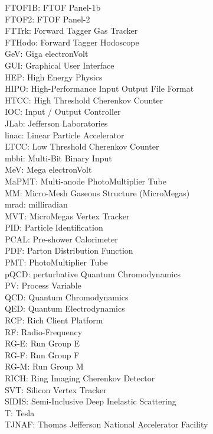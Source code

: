 {    FTOF1B:    FTOF Panel-1b \\
    FTOF2:     FTOF Panel-2 \\
    FTTrk:     Forward Tagger Gas Tracker \\
    FTHodo:    Forward Tagger Hodoscope \\
    GeV:       Giga electronVolt \\
    GUI:       Graphical User Interface \\
    HEP:       High Energy Physics \\
    HIPO:      High-Performance Input Output File Format \\
    HTCC:      High Threshold Cherenkov Counter \\
    IOC:       Input / Output Controller \\
    JLab:      Jefferson Laboratories \\
    linac:     Linear Particle Accelerator \\
    LTCC:      Low Threshold Cherenkov Counter \\
    mbbi:      Multi-Bit Binary Input \\
    MeV:       Mega electronVolt \\
    MaPMT:     Multi-anode PhotoMultiplier Tube \\
    MM:        Micro-Mesh Gaseous Structure (MicroMegas) \\
    mrad:      milliradian \\
    MVT:       MicroMegas Vertex Tracker \\
    PID:       Particle Identification \\
    PCAL:      Pre-shower Calorimeter \\
    PDF:       Parton Distribution Function \\
    PMT:       PhotoMultiplier Tube \\
    pQCD:      perturbative Quantum Chromodynamics \\
    PV:        Process Variable \\
    QCD:       Quantum Chromodynamics \\
    QED:       Quantum Electrodynamics \\
    RCP:       Rich Client Platform \\
    RF:        Radio-Frequency \\
    RG-E:      Run Group E \\
    RG-F:      Run Group F \\
    RG-M:      Run Group M \\
    RICH:      Ring Imaging Cherenkov Detector \\
    SVT:       Silicon Vertex Tracker \\
    SIDIS:     Semi-Inclusive Deep Inelastic Scattering \\
    T:         Tesla \\
    TJNAF:     Thomas Jefferson National Accelerator Facility

}
